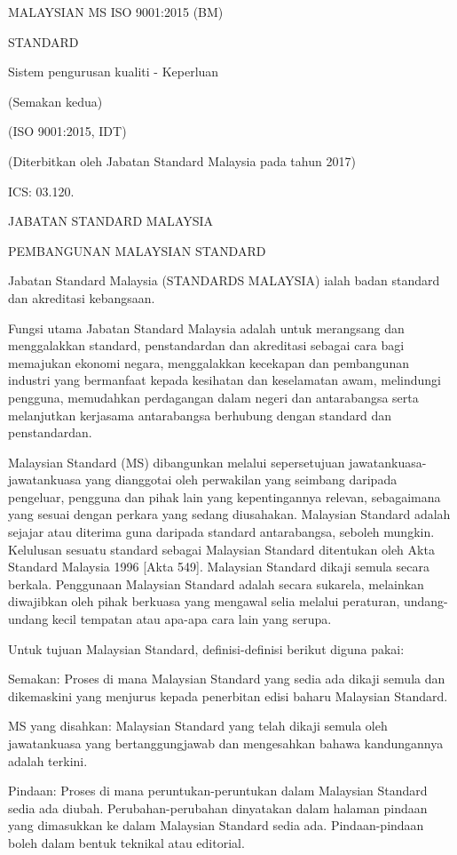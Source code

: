 \documentclass[
]{article}
\author{}
\date{\vspace{-2.5em}}
\begin{document}
MALAYSIAN MS ISO 9001:2015 (BM)

STANDARD

Sistem pengurusan kualiti - Keperluan

(Semakan kedua)

(ISO 9001:2015, IDT)

(Diterbitkan oleh Jabatan Standard Malaysia pada tahun 2017)

ICS: 03.120.

JABATAN STANDARD MALAYSIA

PEMBANGUNAN MALAYSIAN STANDARD

Jabatan Standard Malaysia (STANDARDS MALAYSIA) ialah badan standard dan
akreditasi kebangsaan.

Fungsi utama Jabatan Standard Malaysia adalah untuk merangsang dan
menggalakkan standard, penstandardan dan akreditasi sebagai cara bagi
memajukan ekonomi negara, menggalakkan kecekapan dan pembangunan
industri yang bermanfaat kepada kesihatan dan keselamatan awam,
melindungi pengguna, memudahkan perdagangan dalam negeri dan
antarabangsa serta melanjutkan kerjasama antarabangsa berhubung dengan
standard dan penstandardan.

Malaysian Standard (MS) dibangunkan melalui sepersetujuan
jawatankuasa-jawatankuasa yang dianggotai oleh perwakilan yang seimbang
daripada pengeluar, pengguna dan pihak lain yang kepentingannya relevan,
sebagaimana yang sesuai dengan perkara yang sedang diusahakan. Malaysian
Standard adalah sejajar atau diterima guna daripada standard
antarabangsa, seboleh mungkin. Kelulusan sesuatu standard sebagai
Malaysian Standard ditentukan oleh Akta Standard Malaysia 1996 {[}Akta
549{]}. Malaysian Standard dikaji semula secara berkala. Penggunaan
Malaysian Standard adalah secara sukarela, melainkan diwajibkan oleh
pihak berkuasa yang mengawal selia melalui peraturan, undang-undang
kecil tempatan atau apa-apa cara lain yang serupa.

Untuk tujuan Malaysian Standard, definisi-definisi berikut diguna pakai:

Semakan: Proses di mana Malaysian Standard yang sedia ada dikaji semula
dan dikemaskini yang menjurus kepada penerbitan edisi baharu Malaysian
Standard.

MS yang disahkan: Malaysian Standard yang telah dikaji semula oleh
jawatankuasa yang bertanggungjawab dan mengesahkan bahawa kandungannya
adalah terkini.

Pindaan: Proses di mana peruntukan-peruntukan dalam Malaysian Standard
sedia ada diubah. Perubahan-perubahan dinyatakan dalam halaman pindaan
yang dimasukkan ke dalam Malaysian Standard sedia ada. Pindaan-pindaan
boleh dalam bentuk teknikal atau editorial.
\end{document}

